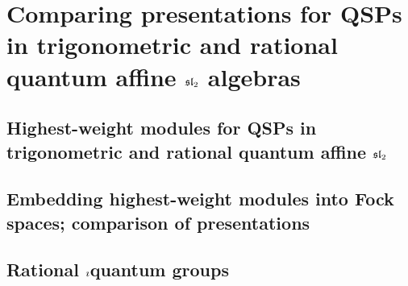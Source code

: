 \section{\texorpdfstring{Comparing presentations for QSPs in trigonometric and rational quantum affine $\sl_2$ algebras}{}}
    \subsection{\texorpdfstring{Highest-weight modules for QSPs in trigonometric and rational quantum affine $\sl_2$}{}}

    \subsection{\texorpdfstring{Embedding highest-weight modules into Fock spaces; comparison of presentations}{}}

    \subsection{\texorpdfstring{Rational $\i$quantum groups}{}}